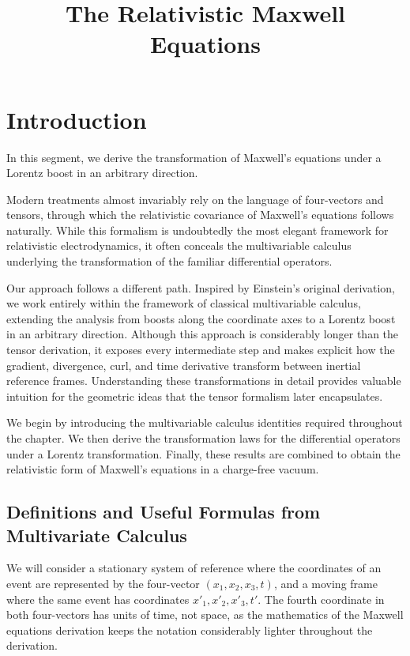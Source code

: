\documentclass[12pt]{article}
\title{The Relativistic Maxwell Equations}
\author{}
\date{}
\begin{document}
\maketitle


\section{Introduction}
In this segment, we derive the transformation of Maxwell's equations under a Lorentz boost in
an arbitrary direction.

Modern treatments almost invariably rely on the language of four-vectors and tensors, through
which the relativistic covariance of Maxwell's equations follows naturally. While this
formalism is undoubtedly the most elegant framework for relativistic electrodynamics, it often
conceals the multivariable calculus underlying the transformation of the familiar differential
operators.

Our approach follows a different path. Inspired by Einstein's original derivation, we work
entirely within the framework of classical multivariable calculus, extending the analysis from
boosts along the coordinate axes to a Lorentz boost in an arbitrary direction. Although this
approach is considerably longer than the tensor derivation, it exposes every intermediate step
and makes explicit how the gradient, divergence, curl, and time derivative transform between
inertial reference frames. Understanding these transformations in detail provides valuable
intuition for the geometric ideas that the tensor formalism later encapsulates.

We begin by introducing the multivariable calculus identities required throughout the chapter.
We then derive the transformation laws for the differential operators under a Lorentz
transformation. Finally, these results are combined to obtain the relativistic form of
Maxwell's equations in a charge-free vacuum.

\subsection{Definitions and Useful Formulas from Multivariate Calculus}

We will consider a stationary system of reference where the coordinates of an event are
represented by the four-vector $(x_1, x_2, x_3, t)$, and a moving frame where the same event
has coordinates $x'_1, x'_2, x'_3, t'$. The fourth coordinate in both four-vectors has units
of time, not space, as the mathematics of the Maxwell equations derivation keeps the notation considerably
lighter throughout the derivation.
\end{document}
